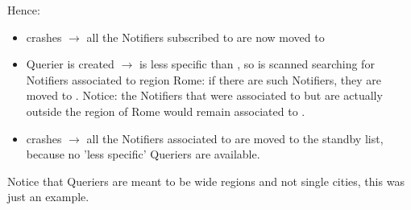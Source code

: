 	Hence:
	\begin{itemize}[label=--]
		\item {} crashes $\rightarrow$ all the Notifiers subscribed to  are now moved to 
		\item {} Querier is created $\rightarrow$  is less specific than , so  is scanned searching for Notifiers associated to region Rome: if there are such Notifiers, they are moved to . Notice: the Notifiers that were associated to  but are actually outside the region of Rome would remain associated to .
		\item {} crashes $\rightarrow$ all the Notifiers associated to  are moved to the standby list, because no 'less specific' Queriers are available.
	\end{itemize}
	\smallskip
	Notice that Queriers are meant to be wide regions and not single cities, this was just an example.
